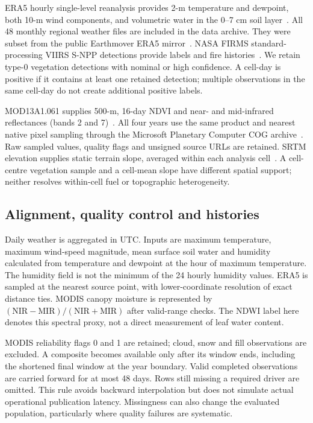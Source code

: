 \documentclass[conference]{IEEEtran}
\begin{document}
ERA5 hourly single-level reanalysis provides 2-m temperature and dewpoint, both 10-m wind components, and volumetric water in the 0--7 cm soil layer~\cite{era5}. All 48 monthly regional weather files are included in the data archive. They were subset from the public Earthmover ERA5 mirror~\cite{earthmover}. NASA FIRMS standard-processing VIIRS S-NPP detections provide labels and fire histories~\cite{firms,viirs}. We retain type-0 vegetation detections with nominal or high confidence. A cell-day is positive if it contains at least one retained detection; multiple observations in the same cell-day do not create additional positive labels.

MOD13A1.061 supplies 500-m, 16-day NDVI and near- and mid-infrared reflectances (bands 2 and 7)~\cite{modis}. All four years use the same product and nearest native pixel sampling through the Microsoft Planetary Computer COG archive~\cite{planetary}. Raw sampled values, quality flags and unsigned source URLs are retained. SRTM elevation supplies static terrain slope, averaged within each analysis cell~\cite{srtm}. A cell-centre vegetation sample and a cell-mean slope have different spatial support; neither resolves within-cell fuel or topographic heterogeneity.

\subsection{Alignment, quality control and histories}
Daily weather is aggregated in UTC. Inputs are maximum temperature, maximum wind-speed magnitude, mean surface soil water and humidity calculated from temperature and dewpoint at the hour of maximum temperature. The humidity field is not the minimum of the 24 hourly humidity values. ERA5 is sampled at the nearest source point, with lower-coordinate resolution of exact distance ties. MODIS canopy moisture is represented by $(\mathrm{NIR}-\mathrm{MIR})/(\mathrm{NIR}+\mathrm{MIR})$ after valid-range checks. The NDWI label here denotes this spectral proxy, not a direct measurement of leaf water content.

MODIS reliability flags 0 and 1 are retained; cloud, snow and fill observations are excluded. A composite becomes available only after its window ends, including the shortened final window at the year boundary. Valid completed observations are carried forward for at most 48 days. Rows still missing a required driver are omitted. This rule avoids backward interpolation but does not simulate actual operational publication latency. Missingness can also change the evaluated population, particularly where quality failures are systematic.
\end{document}
